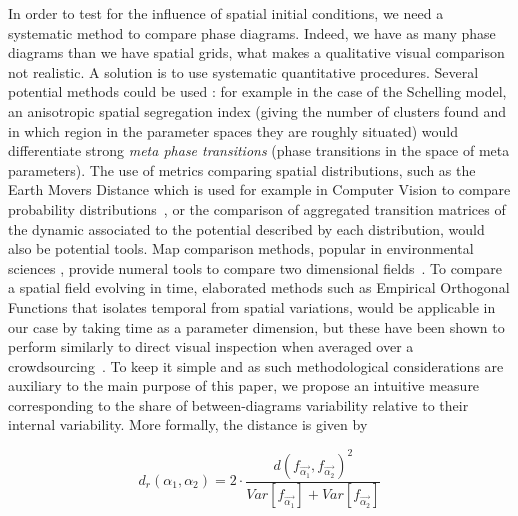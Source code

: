 \documentclass[Afour,sageh,times]{sagej}
\begin{document}
In order to test for the influence of spatial initial conditions, we need a systematic method to compare phase diagrams. Indeed, we have as many phase diagrams than we have spatial grids, what makes a qualitative visual comparison not realistic. A solution is to use systematic quantitative procedures. Several potential methods could be used : for example in the case of the Schelling model, an anisotropic spatial segregation index (giving the number of clusters found and in which region in the parameter spaces they are roughly situated) would differentiate strong \emph{meta phase transitions} (phase transitions in the space of meta parameters). The use of metrics comparing spatial distributions, such as the Earth Movers Distance which is used for example in Computer Vision to compare probability distributions~\cite{rubner2000earth}, or the comparison of aggregated transition matrices of the dynamic associated to the potential described by each distribution, would also be potential tools. Map comparison methods, popular in environmental sciences , provide numeral tools to compare two dimensional fields~\cite{visser2006map}. To compare a spatial field evolving in time, elaborated methods such as Empirical Orthogonal Functions that isolates temporal from spatial variations, would be applicable in our case by taking time as a parameter dimension, but these have been shown to perform similarly to direct visual inspection when averaged over a crowdsourcing~\cite{10.1371/journal.pone.0178165}. To keep it simple and as such methodological considerations are auxiliary to the main purpose of this paper, we propose an intuitive measure corresponding to the share of between-diagrams variability relative to their internal variability. More formally, the distance is given by

\begin{equation}\label{eq:phase-distance}
d_r\left(\alpha_1,\alpha_2\right) = 2 \cdot \frac{d(f_{\vec{\alpha_1}},f_{\vec{\alpha_2}})^2}{Var\left[f_{\vec{\alpha_1}}\right] + Var\left[f_{\vec{\alpha_2}}\right]}
\end{equation}
\end{document}
